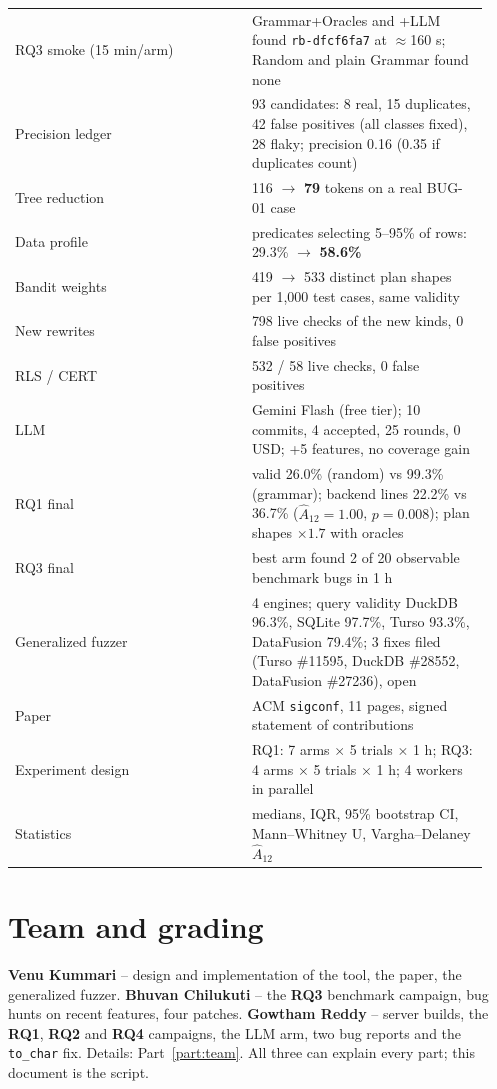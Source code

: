 \begin{longtable}{p{0.47\linewidth}p{0.47\linewidth}}
RQ3 smoke (15 min/arm) & Grammar+Oracles and +LLM found \texttt{rb-dfcf6fa7} at $\approx$160 s; Random and plain Grammar found none \\
Precision ledger & 93 candidates: 8 real, 15 duplicates, 42 false positives (all classes fixed), 28 flaky; precision 0.16 (0.35 if duplicates count) \\
Tree reduction & 116 $\rightarrow$ \textbf{79} tokens on a real BUG-01 case \\
Data profile & predicates selecting 5--95\% of rows: 29.3\% $\rightarrow$ \textbf{58.6\%} \\
Bandit weights & 419 $\rightarrow$ 533 distinct plan shapes per 1{,}000 test cases, same validity \\
New rewrites & 798 live checks of the new kinds, 0 false positives \\
RLS / CERT & 532 / 58 live checks, 0 false positives \\
LLM & Gemini Flash (free tier); 10 commits, 4 accepted, 25 rounds, 0 USD; +5 features, no coverage gain \\
RQ1 final & valid 26.0\% (random) vs 99.3\% (grammar); backend lines 22.2\% vs 36.7\% ($\hat A_{12}=1.00$, $p=0.008$); plan shapes $\times1.7$ with oracles \\
RQ3 final & best arm found 2 of 20 observable benchmark bugs in 1 h \\
Generalized fuzzer & 4 engines; query validity DuckDB 96.3\%, SQLite 97.7\%, Turso 93.3\%, DataFusion 79.4\%; 3 fixes filed (Turso \#11595, DuckDB \#28552, DataFusion \#27236), open \\
Paper & ACM \texttt{sigconf}, 11 pages, signed statement of contributions \\
Experiment design & RQ1: 7 arms $\times$ 5 trials $\times$ 1 h; RQ3: 4 arms $\times$ 5 trials $\times$ 1 h; 4 workers in parallel \\
Statistics & medians, IQR, 95\% bootstrap CI, Mann--Whitney U, Vargha--Delaney $\hat A_{12}$ \\
\bottomrule
\end{longtable}

\section{Team and grading}

\textbf{Venu Kummari} -- design and implementation of the tool, the paper, the
generalized fuzzer. \textbf{Bhuvan Chilukuti} -- the \textbf{RQ3} benchmark
campaign, bug hunts on recent features, four patches. \textbf{Gowtham Reddy} --
server builds, the \textbf{RQ1}, \textbf{RQ2} and \textbf{RQ4} campaigns, the LLM
arm, two bug reports and the \texttt{to\_char} fix. Details: Part~\ref{part:team}.
All three can explain every part; this document is the script.

